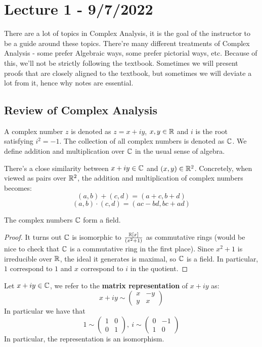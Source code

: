 \section{Lecture 1 - 9/7/2022}
There are a lot of topics in Complex Analysis, it is the goal of the instructor to be a guide around these topics. There're many different treatments of Complex Analysis - some prefer Algebraic ways, some prefer pictorial ways, etc. Because of this, we'll not be strictly following the textbook. Sometimes we will present proofs that are closely aligned to the textbook, but sometimes we will deviate a lot from it, hence why notes are essential.

\subsection{Review of Complex Analysis}

\begin{definition}
    A complex number $z$ is denoted as $z = x + iy$, $x, y \in \mathbb{R}$ and $i$ is the root satisfying $i^2 = -1$. The collection of all complex numbers is denoted as $\mathbb{C}$. We define addition and multiplication over $\mathbb{C}$ in the usual sense of algebra.
\end{definition}

    \noindent There's a close similarity between $x + iy \in \mathbb{C}$ and $(x, y) \in \mathbb{R}^2$. Concretely, when viewed as pairs over $\mathbb{R}^2$, the addition and multiplication of complex numbers becomes:
    \[(a, b) + (c, d) = (a + c, b + d)\]
    \[(a, b) \cdot (c, d) = (ac - bd, bc + ad)\]

\begin{proposition}
    The complex numbers $\mathbb{C}$ form a field.
\end{proposition}

\begin{proof}
    It turns out $\mathbb{C}$ is isomorphic to $\frac{\mathbb{R}[x]}{(x^2 + 1)}$ as commutative rings (would be nice to check that $\mathbb{C}$ is a commutative ring in the first place). Since $x^2 + 1$ is irreducible over $\mathbb{R}$, the ideal it generates is maximal, so $\mathbb{C}$ is a field. In particular, $1$ correspond to $1$ and $x$ correspond to $i$ in the quotient.
\end{proof}

\begin{definition}
    Let $x + iy \in \mathbb{C}$, we refer to the \textbf{matrix representation} of $x + iy$ as:
    \[x + iy \sim \begin{pmatrix} x & -y\\ y & x\end{pmatrix}\]
    In particular we have that
    \[1 \sim \begin{pmatrix} 1 & 0\\ 0 & 1\end{pmatrix},\ i \sim \begin{pmatrix}
    0 & -1 \\ 1 & 0
    \end{pmatrix}\]
    In particular, the representation is an isomorphism.
\end{definition}


